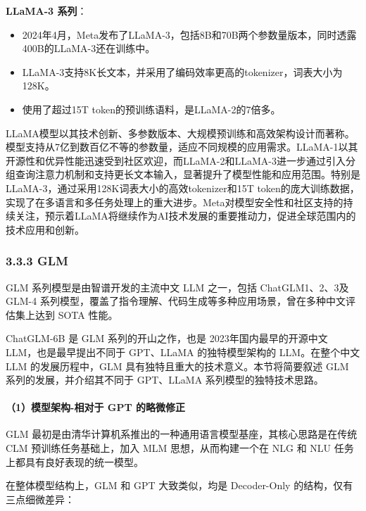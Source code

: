 \documentclass[12pt,a4paper]{book}
\begin{document}
\textbf{LLaMA-3 系列}：

\begin{itemize}
\tightlist
\item
  2024年4月，Meta发布了LLaMA-3，包括8B和70B两个参数量版本，同时透露400B的LLaMA-3还在训练中。
\item
  LLaMA-3支持8K长文本，并采用了编码效率更高的tokenizer，词表大小为128K。
\item
  使用了超过15T token的预训练语料，是LLaMA-2的7倍多。
\end{itemize}

LLaMA模型以其技术创新、多参数版本、大规模预训练和高效架构设计而著称。模型支持从7亿到数百亿不等的参数量，适应不同规模的应用需求。LLaMA-1以其开源性和优异性能迅速受到社区欢迎，而LLaMA-2和LLaMA-3进一步通过引入分组查询注意力机制和支持更长文本输入，显著提升了模型性能和应用范围。特别是LLaMA-3，通过采用128K词表大小的高效tokenizer和15T
token的庞大训练数据，实现了在多语言和多任务处理上的重大进步。Meta对模型安全性和社区支持的持续关注，预示着LLaMA将继续作为AI技术发展的重要推动力，促进全球范围内的技术应用和创新。

\subsubsection{3.3.3 GLM}\label{glm}

GLM 系列模型是由智谱开发的主流中文 LLM 之一，包括 ChatGLM1、2、3及 GLM-4
系列模型，覆盖了指令理解、代码生成等多种应用场景，曾在多种中文评估集上达到
SOTA 性能。

ChatGLM-6B 是 GLM 系列的开山之作，也是 2023年国内最早的开源中文
LLM，也是最早提出不同于 GPT、LLaMA 的独特模型架构的 LLM。在整个中文 LLM
的发展历程中，GLM 具有独特且重大的技术意义。本节将简要叙述 GLM
系列的发展，并介绍其不同于 GPT、LLaMA 系列模型的独特技术思路。

\paragraph{（1）模型架构-相对于 GPT
的略微修正}\label{ux6a21ux578bux67b6ux6784-ux76f8ux5bf9ux4e8e-gpt-ux7684ux7565ux5faeux4feeux6b63}

GLM 最初是由清华计算机系推出的一种通用语言模型基座，其核心思路是在传统
CLM 预训练任务基础上，加入 MLM 思想，从而构建一个在 NLG 和 NLU
任务上都具有良好表现的统一模型。

在整体模型结构上，GLM 和 GPT 大致类似，均是 Decoder-Only
的结构，仅有三点细微差异：
\end{document}
